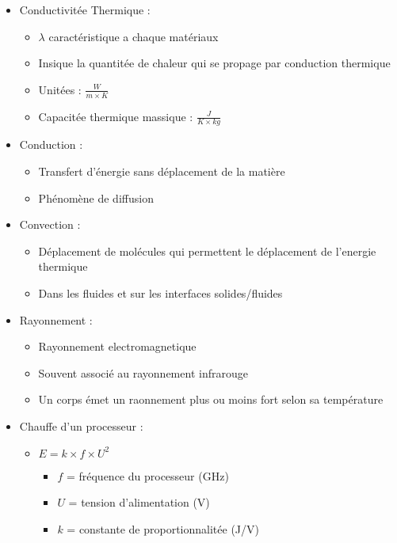 \documentclass[a4paper]{article}
\begin{document}
\begin{itemize}
    \item Conductivitée Thermique :
        \begin{itemize}
            \item $\lambda$ caractéristique a chaque matériaux
            \item Insique la quantitée de chaleur qui se propage par conduction thermique
            \item Unitées : $\frac{W}{m \times K}$
            \item Capacitée thermique massique : $\frac{J}{K \times kg}$
        \end{itemize}
        \vspace{0.5cm}
    \item Conduction :
        \begin{itemize}
            \item Transfert d'énergie sans déplacement de la matière
            \item Phénomène de diffusion
        \end{itemize}
    \item Convection :
        \begin{itemize}
            \item Déplacement de molécules qui permettent le déplacement de l'energie thermique
            \item Dans les fluides et sur les interfaces solides/fluides
        \end{itemize}
    \item Rayonnement :
        \begin{itemize}
            \item Rayonnement electromagnetique
            \item Souvent associé au rayonnement infrarouge
            \item Un corps émet un raonnement plus ou moins fort selon sa température
        \end{itemize}
        \vspace{0.5cm}
    \item Chauffe d'un processeur :
        \begin{itemize}
            \item $E = k \times f \times U^2$
            \begin{itemize}
                \item $f$ = fréquence du processeur (GHz)
                \item $U$ = tension d'alimentation (V)
                \item $k$ = constante de proportionnalitée (J/V)
            \end{itemize}
        \end{itemize}
\end{itemize}
\end{document}

